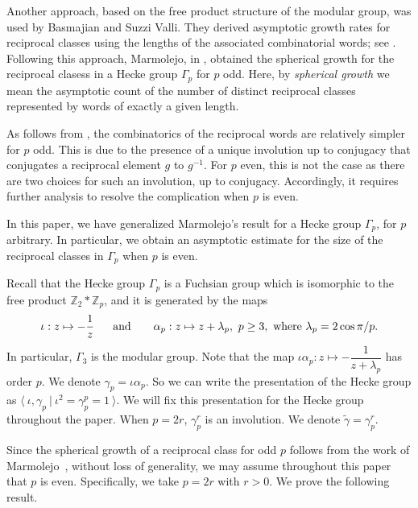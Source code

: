 \documentclass[11pt]{amsart}
\numberwithin{equation}{section}
\theoremstyle{definition}
\newcommand{\ap}{\alpha_{p}}
\newcommand{\z}{\mathbb{Z}}
\newcommand{\g}{\gamma_{p}}
\newcommand{\io}{\iota }
\numberwithin{equation}{section}
\begin{document}
	
	Another approach, based on the free product structure of the modular group, was used by Basmajian and Suzzi Valli.  They derived asymptotic growth rates for reciprocal classes using the lengths of the associated combinatorial words; see \cite{BV}.  Following this approach, Marmolejo, in \cite{Ma},  obtained the spherical growth for the reciprocal clasess in a Hecke group $\Gamma_p$ for $p$ odd. Here, by {\em spherical growth} we mean the asymptotic count of the number of distinct reciprocal classes represented by words of exactly a given length. 
    
    
    
    As follows from \cite{DG}, the combinatorics of the reciprocal words are relatively simpler for $p$ odd. This is due to the presence of a unique involution up to conjugacy that conjugates a reciprocal element $g$ to $g^{-1}$. For $p$ even, this is not the case as there are two choices for such an involution, up to conjugacy. Accordingly, it requires further analysis to resolve the complication when $p$ is even. 
	
	In this paper, we have generalized Marmolejo's result for a Hecke group $\Gamma_p$, for $p$ arbitrary. In particular, we obtain an asymptotic estimate for the size of the reciprocal classes in $\Gamma_p$ when $p$ is even.  
	
	Recall that the Hecke group $ \Gamma_{p} $ is a Fuchsian group which is isomorphic to the free product  $ \z_{2} \ast \z_{p}$, and it is generated by 
	the maps
	$$\iota: z\mapsto-\dfrac{1}{z}~~~~~ \\ \hbox{ and } \\ ~ ~~~~ \alpha_p: z\mapsto z+ \lambda_{p}, ~ p \geq 3, \hbox{ where}~ \lambda_{p}=2\cos\pi/p. $$  
	In particular, $\Gamma_3$ is the modular group. Note that the map $ \iota\ap :z \mapsto -\dfrac{1}{z+\lambda_{p}} $ has order  $ p $. We denote $ \g=\iota \alpha_p$. So we can write the presentation of the Hecke group as $\langle~\io,\g~|~\io^2=\g^p=1 ~\rangle$. We will fix this presentation for the Hecke group throughout the paper. When $p=2r$, $\g^r$ is an involution. We denote $\tilde \gamma=\g^r$. 
	
	Since the spherical growth of a reciprocal class for odd $p$ follows from the work of Marmolejo~\cite{Ma}, without loss of generality, we may assume throughout this paper that $p$ is even. Specifically, we take $p = 2r$ with $r > 0$. We prove the following result.
	
\end{document}
